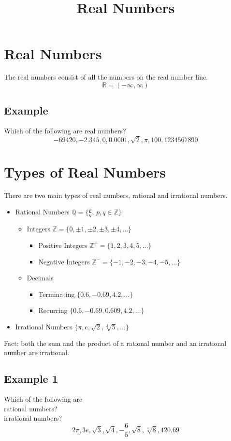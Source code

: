 \documentclass[a4paper,12pt]{article}
\title{Real Numbers}
\date{}
\begin{document}
\maketitle
\section{Real Numbers}
The real numbers consist of all the numbers on the real number line.
\[\mathbb R=(-\infty,\infty)\]
\subsection{Example}
Which of the following are real numbers?
\[-69420,-2.345,0,0.0001,\sqrt2,\pi,100,1234567890\]
\newpage

\section{Types of Real Numbers}
There are two main types of real numbers, rational and irrational numbers.
\begin{itemize}
    \item Rational Numbers \(\mathbb Q=\{\frac pq,\,p,q\in\mathbb Z\}\)
\begin{itemize}
    \item Integers \(\mathbb Z=\{0,\pm1,\pm2,\pm3,\pm4,\dots\}\)
\begin{itemize}
    \item Positive Integers \(\mathbb Z^+=\{1,2,3,4,5,\dots\}\)
    \item Negative Integers \(\mathbb Z^-=\{-1,-2,-3,-4,-5,\dots\}\)
\end{itemize}
    \item Decimals
\begin{itemize}
    \item Terminating \(\{0.6,-0.69,4.2,\dots\}\)
    \item Recurring \(\{0.\dot6,-0.\dot6\dot9,0.\dot60\dot9,4.\dot2,\dots\}\)
\end{itemize}
\end{itemize}
    \item Irrational Numbers \(\{\pi,e,\sqrt2,\sqrt[3]5,\dots\}\)
\end{itemize}
Fact: both the sum and the product of a rational number and an irrational number are irrational.

\subsection{Example 1}
Which of the following are\\
rational numbers?\\
irrational numbers?
\[2\pi,3e,\sqrt3,\sqrt4,-\frac65,\sqrt8,\sqrt[3]8,420.69\]
\end{document}
